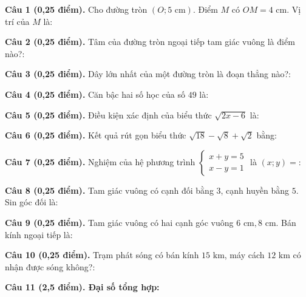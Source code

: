 \documentclass[12pt,a4paper]{article}
\begin{document}
\vspace{1.2mm}
\noindent\textbf{Câu 1 (0,25 điểm).} Cho đường tròn $(O; 5\text{ cm})$. Điểm $M$ có $OM = 4\text{ cm}$. Vị trí của $M$ là: \par\vspace{0.6mm}
\noindent\textbf{Câu 2 (0,25 điểm).} Tâm của đường tròn ngoại tiếp tam giác vuông là điểm nào?: \par\vspace{0.6mm}
\noindent\textbf{Câu 3 (0,25 điểm).} Dây lớn nhất của một đường tròn là đoạn thẳng nào?: \par\vspace{0.6mm}
\noindent\textbf{Câu 4 (0,25 điểm).} Căn bậc hai số học của số $49$ là: \par\vspace{0.6mm}
\noindent\textbf{Câu 5 (0,25 điểm).} Điều kiện xác định của biểu thức $\sqrt{2x - 6}$ là: \par\vspace{0.6mm}
\noindent\textbf{Câu 6 (0,25 điểm).} Kết quả rút gọn biểu thức $\sqrt{18} - \sqrt{8} + \sqrt{2}$ bằng: \par\vspace{0.6mm}
\noindent\textbf{Câu 7 (0,25 điểm).} Nghiệm của hệ phương trình $\begin{cases} x + y = 5 \\ x - y = 1 \end{cases}$ là $(x; y) = $: \par\vspace{0.6mm}
\noindent\textbf{Câu 8 (0,25 điểm).} Tam giác vuông có cạnh đối bằng $3$, cạnh huyền bằng $5$. Sin góc đối là: \par\vspace{0.6mm}
\noindent\textbf{Câu 9 (0,25 điểm).} Tam giác vuông có hai cạnh góc vuông $6\text{ cm}, 8\text{ cm}$. Bán kính ngoại tiếp là: \par\vspace{0.6mm}
\noindent\textbf{Câu 10 (0,25 điểm).} Trạm phát sóng có bán kính $15\text{ km}$, máy cách $12\text{ km}$ có nhận được sóng không?: \par\vspace{0.6mm}
\vspace{0.8mm}
\noindent\textbf{Câu 11 (2,5 điểm). Đại số tổng hợp:}
\vspace{0.6mm}
\end{document}
